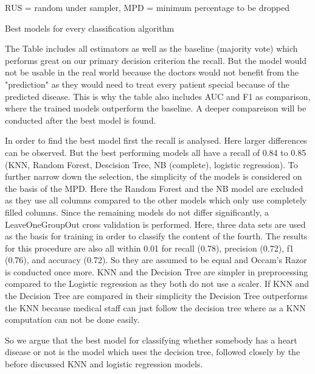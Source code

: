 \begin{table}[]
\begin{footnotesize}
		\begin{center}
			\centering
			RUS = random under sampler, MPD = minimum percentage to be dropped
		\end{center}
	\end{footnotesize}
	\caption{Best models for every classification algorithm}
	\label{table:modelresults}

\end{table}

The Table includes all estimators as well as the baseline (majority vote) which performs great on our primary decision criterion the recall. But the model would not be usable in the real world because the doctors would not benefit from the "prediction" as they would need to treat every patient special because of the predicted disease. This is why the table also includes AUC and F1 as comparison, where the trained models outperform the baseline. A deeper compareison will be conducted after the best model is found. 

In order to find the best model first the recall is analysed. Here larger differences can be observed. But the best performing models all have a recall of 0.84 to 0.85 (KNN, Random Forest, Descision Tree, NB (complete), logistic regression).  To further narrow down the selection, the simplicity of the models is considered on the basis of the MPD. Here the Random Forest and the NB model are excluded as they use all columns compared to the other models which only use completely filled columns. Since the remaining models do not differ significantly, a LeaveOneGroupOut cross validation is performed. Here, three data sets are used as the basis for training in order to classify the content of the fourth. The results for this procedure are also all within 0.01 for recall (0.78), precision (0.72), f1 (0.76), and accuracy (0.72). So they are assumed to be equal and Occam's Razor is conducted once more. KNN and the Decision Tree are simpler in preprocessing compared to the Logistic regression as they both do not use a scaler. If KNN and the Decision Tree are compared in their simplicity the Decision Tree outperforms the KNN because medical staff can just follow the decision tree where as a KNN computation can not be done easily. 

So we argue that the best model for classifying whether somebody has a heart disease or not is the model which uses the decision tree, followed closely by the before discussed KNN and logistic regression models.

